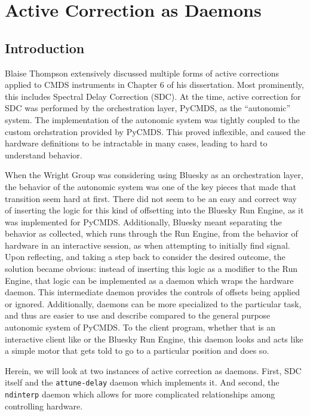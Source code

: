\chapter{Active Correction as Daemons} \label{cha:act_corr}

\clearpage

\section{Introduction}  %

Blaise Thompson extensively discussed multiple forms of active corrections applied to CMDS instruments in Chapter 6 of his dissertation\cite{ThompsonBlaiseJonathan2018a}.
Most prominently, this includes Spectral Delay Correction (SDC).
At the time, active correction for SDC was performed by the orchestration layer, PyCMDS, as the ``autonomic'' system.
The implementation of the autonomic system was tightly coupled to the custom orchstration provided by PyCMDS.
This proved inflexible, and caused the hardware definitions to be intractable in many cases, leading to hard to understand behavior.

When the Wright Group was considering using Bluesky as an orchestration layer, the behavior of the autonomic system was one of the key pieces that made that transition seem hard at first.
There did not seem to be an easy and correct way of inserting the logic for this kind of offsetting into the Bluesky Run Engine, as it was implemented for PyCMDS.
Additionally, Bluesky meant separating the behavior as collected, which runs through the Run Engine, from the behavior of hardware in an interactive session, as when attempting to initially find signal.
Upon reflecting, and taking a step back to consider the desired outcome, the solution became obvious: instead of inserting this logic as a modifier to the Run Engine, that logic can be implemented as a daemon which wraps the hardware daemon.
This intermediate daemon provides the controls of offsets being applied or ignored.
Additionally, daemons can be more specialized to the particular task, and thus are easier to use and describe compared to the general purpose autonomic system of PyCMDS.
To the client program, whether that is an interactive client like \yaqcqtpy{} or the Bluesky Run Engine, this daemon looks and acts like a simple motor that gets told to go to a particular position and does so.

Herein, we will look at two instances of active correction as daemons.
First, SDC itself and the \texttt{attune-delay} daemon which implements it.
And second, the \texttt{ndinterp} daemon which allows for more complicated relationships among controlling hardware.

